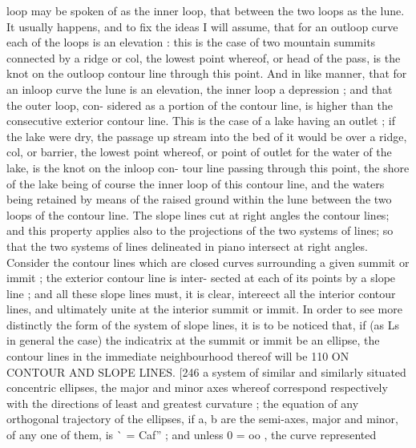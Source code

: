 \documentclass[11pt,a4paper]{book}
\begin{document}
loop  may  be  spoken  of  as  the  inner  loop,  that  between  the  two  loops  as  the  lune.
It  usually  happens,  and  to  fix  the  ideas  I  will  assume,  that  for  an  outloop  curve  each
of  the  loops  is  an  elevation :  this  is  the  case  of  two  mountain  summits  connected  by
a  ridge  or  col,  the  lowest  point  whereof,  or  head  of  the  pass,  is  the  knot  on  the
outloop  contour  line  through  this  point.  And  in  like  manner,  that  for  an  inloop  curve
the  lune  is  an  elevation,  the  inner  loop  a  depression ;  and  that  the  outer  loop,  con-
sidered as  a  portion  of  the  contour  line,  is  higher  than  the  consecutive  exterior  contour
line.  This  is  the  case  of  a  lake  having  an  outlet ;  if  the  lake  were  dry,  the  passage
up  stream  into  the  bed  of  it  would  be  over  a  ridge,  col,  or  barrier,  the  lowest  point
whereof,  or  point  of  outlet  for  the  water  of  the  lake,  is  the  knot  on  the  inloop  con-
tour line  passing  through  this  point,  the  shore  of  the  lake  being  of  course  the  inner
loop  of  this  contour  line,  and  the  waters  being  retained  by  means  of  the  raised  ground
within  the  lune  between  the  two  loops  of  the  contour  line.
The  slope  lines  cut  at  right  angles  the  contour  lines;  and  this  property  applies
also  to  the  projections  of  the  two  systems  of  lines;  so  that  the  two  systems  of  lines
delineated  in  piano  intersect  at  right  angles.  Consider  the  contour  lines  which  are
closed  curves  surrounding  a  given  summit  or  immit ;  the  exterior  contour  line  is  inter-
sected at  each  of  its  points  by  a  slope  line ;  and  all  these  slope  lines  must,  it  is
clear,  intereect  all  the  interior  contour  lines,  and  ultimately  unite  at  the  interior  summit
or  immit.  In  order  to  see  more  distinctly  the  form  of  the  system  of  slope  lines,  it
is  to  be  noticed  that,  if  (as  Ls  in  general  the  case)  the  indicatrix  at  the  summit  or
immit   be   an   ellipse,  the   contour  lines   in  the  immediate  neighbourhood  thereof  will  be
110  ON   CONTOUR   AND   SLOPE   LINES.  [246
a  system  of  similar  and  similarly  situated  concentric  ellipses,  the  major  and  minor  axes
whereof  correspond  respectively  with  the  directions  of  least  and  greatest  curvature ;  the
equation  of  any  orthogonal  trajectory  of  the  ellipses,  if  a,  b  are  the  semi-axes,  major
and  minor,  of  any  one  of  them,  is  ^^  =  Caf'' ;  and  unless  0  =  oo ,  the  curve  represented
\end{document}

